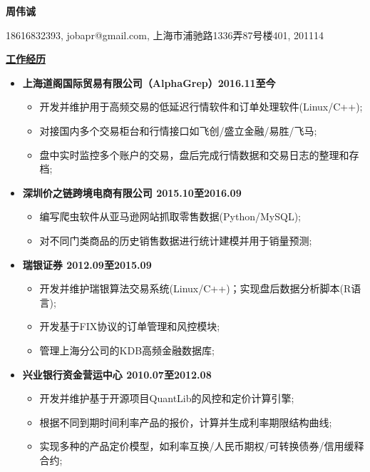 \documentclass[a4paper]{article}
\begin{document}
  \begin{center} {\bfseries {} 周伟诚}
  
  \vspace{2ex}
   18616832393, jobapr@gmail.com, 上海市浦驰路1336弄87号楼401, 201114
  \end{center}


\vspace{2.5ex}
\textbf  { \uline{工作经历}}
\vspace{0.005ex}

\begin{itemize}
  \setlength{\topsep}{10ex}
  \setlength{\itemsep}{1.3ex}
  \setlength{\parsep}{10ex}
  \setlength{\parskip}{0ex}
	\item  {\bfseries {}上海道阁国际贸易有限公司（AlphaGrep）\hfill 2016.11至今}
		\begin{itemize}
		\item 开发并维护用于高频交易的低延迟行情软件和订单处理软件(Linux/C++);
		\item 对接国内多个交易柜台和行情接口如飞创/盛立金融/易胜/飞马;
		\item 盘中实时监控多个账户的交易，盘后完成行情数据和交易日志的整理和存档;
		\end{itemize}
	\item  {\bfseries {}深圳价之链跨境电商有限公司 \hfill 2015.10至2016.09}
		\begin{itemize}
		\item 编写爬虫软件从亚马逊网站抓取零售数据(Python/MySQL);
		\item 对不同门类商品的历史销售数据进行统计建模并用于销量预测;
		\end{itemize}
	
	\item  {\bfseries {} 瑞银证券 \hfill 2012.09至2015.09}
		\begin{itemize}
		\item 开发并维护瑞银算法交易系统(Linux/C++)；实现盘后数据分析脚本(R语言);
		\item 开发基于FIX协议的订单管理和风控模块;
		\item 管理上海分公司的KDB高频金融数据库;
		\end{itemize}
	
	\item  {\bfseries {} 兴业银行资金营运中心 \hfill 2010.07至2012.08}
		\begin{itemize}
		\item 开发并维护基于开源项目QuantLib的风控和定价计算引擎;
		\item 根据不同到期时间利率产品的报价，计算并生成利率期限结构曲线; 
		\item 实现多种的产品定价模型，如利率互换/人民币期权/可转换债券/信用缓释合约;
		\end{itemize}
\end{itemize}
\end{document}
